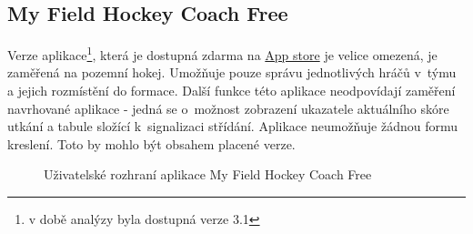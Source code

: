 \documentclass[thesis=B,czech]{FITthesis}[2012/06/26]
\begin{document}
	\subsection{My Field Hockey Coach Free \cite{myFieldHockeyAppstore}}

	Verze aplikace\footnote{v době analýzy byla dostupná verze 3.1}, která je dostupná zdarma na \href{https://itunes.apple.com/us/app/my-field-hockey-coach-free/id457826679?mt=8}{App store} je velice omezená, je zaměřená na pozemní hokej. Umožňuje pouze správu jednotlivých hráčů v~týmu a jejich rozmístění do formace. Další funkce této aplikace neodpovídají zaměření navrhované aplikace \-- jedná se o~možnost zobrazení ukazatele aktuálního skóre utkání a tabule složící k~signalizaci střídání. Aplikace neumožňuje žádnou formu kreslení. Toto by mohlo být obsahem placené verze.

	\begin{figure}[h!t]
		\centering
 		\hfil

 		\caption{Uživatelské rozhraní aplikace My Field Hockey Coach Free}
 		\label{pic:my_field_hockey_coach_free}
	\end{figure}
\end{document}
